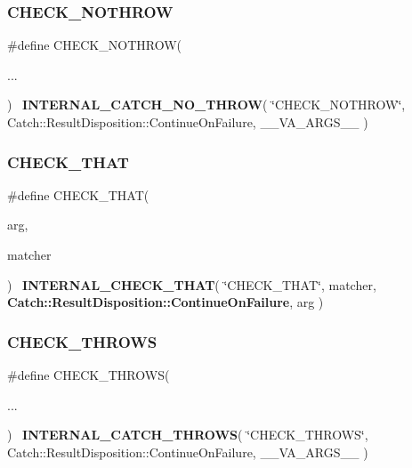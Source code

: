 \mbox{\label{catch_8hpp_a78e70f011f20c4ade1d1ac2b8fd33626}} 
\subsubsection{CHECK\_NOTHROW}
{\footnotesize\ttfamily \#define C\+H\+E\+C\+K\+\_\+\+N\+O\+T\+H\+R\+OW(\begin{DoxyParamCaption}\item[{}]{... }\end{DoxyParamCaption})~\textbf{ I\+N\+T\+E\+R\+N\+A\+L\+\_\+\+C\+A\+T\+C\+H\+\_\+\+N\+O\+\_\+\+T\+H\+R\+OW}( \char`\"{}C\+H\+E\+C\+K\+\_\+\+N\+O\+T\+H\+R\+OW\char`\"{}, Catch\+::\+Result\+Disposition\+::\+Continue\+On\+Failure, \+\_\+\+\_\+\+V\+A\+\_\+\+A\+R\+G\+S\+\_\+\+\_\+ )}

\mbox{\label{catch_8hpp_a5b8c33c63e0804d4458e2c761370b75d}} 
\subsubsection{CHECK\_THAT}
{\footnotesize\ttfamily \#define C\+H\+E\+C\+K\+\_\+\+T\+H\+AT(\begin{DoxyParamCaption}\item[{}]{arg,  }\item[{}]{matcher }\end{DoxyParamCaption})~\textbf{ I\+N\+T\+E\+R\+N\+A\+L\+\_\+\+C\+H\+E\+C\+K\+\_\+\+T\+H\+AT}( \char`\"{}C\+H\+E\+C\+K\+\_\+\+T\+H\+AT\char`\"{}, matcher, \textbf{ Catch\+::\+Result\+Disposition\+::\+Continue\+On\+Failure}, arg )}

\mbox{\label{catch_8hpp_a5c646dfe831e596b59073014c1c8b9e5}} 
\subsubsection{CHECK\_THROWS}
{\footnotesize\ttfamily \#define C\+H\+E\+C\+K\+\_\+\+T\+H\+R\+O\+WS(\begin{DoxyParamCaption}\item[{}]{... }\end{DoxyParamCaption})~\textbf{ I\+N\+T\+E\+R\+N\+A\+L\+\_\+\+C\+A\+T\+C\+H\+\_\+\+T\+H\+R\+O\+WS}( \char`\"{}C\+H\+E\+C\+K\+\_\+\+T\+H\+R\+O\+WS\char`\"{}, Catch\+::\+Result\+Disposition\+::\+Continue\+On\+Failure, \+\_\+\+\_\+\+V\+A\+\_\+\+A\+R\+G\+S\+\_\+\+\_\+ )}

